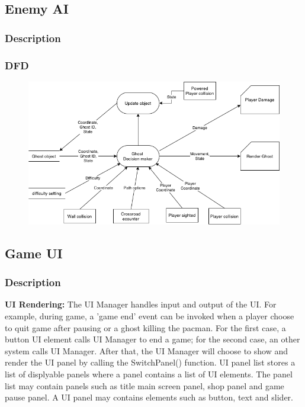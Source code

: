 \documentclass[11pt]{article}
\begin{document}
\subsection{Enemy AI}
\subsubsection{Description}

\subsubsection{DFD}
\begin{figure}[H]
    \centering
    \includegraphics*[scale=0.4]{GhostAI_DFD.png}
\end{figure}
\subsection{Game UI}
\subsubsection{Description}
\textbf{UI Rendering:} The UI Manager handles input and output of the UI. For example, during game, a 'game end' event can be invoked when a player choose to quit game after pausing or a ghost killing the pacman. For the first case, a button UI element calls UI Manager to end a game; for the second case, an other system calls UI Manager. After that, the UI Manager will choose to show and render the UI panel by calling the SwitchPanel() function. UI panel list stores a list of displyable panels where a panel contains a list of UI elements. The panel list may contain panels such as title main screen panel, shop panel and game pause panel. A UI panel may contains elements such as button, text and slider.
\end{document}
